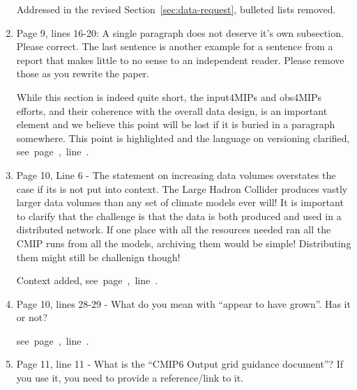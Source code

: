 \documentclass[gmd,manuscript]{copernicus}
\newcommand{\plref}[1]{\mbox{see page \pageref{p-#1}, line
    \lineref{l-#1}.}}
\newenvironment{answer}{\color{blue}}{}
\begin{document}
\begin{enumerate}[label=RC3-\arabic*,leftmargin=*]
  \begin{answer}
    Addressed in the revised Section~\ref{sec:data-request}, bulleted
    lists removed.
  \end{answer}
\item Page 9, lines 16-20: A single paragraph does not deserve it’s own
  subsection. Please correct. The last sentence is another example for
  a sentence from a report that makes little to no sense to an
  independent reader. Please remove those as you rewrite the paper.

  \begin{answer}
    While this section is indeed quite short, the input4MIPs and
    obs4MIPs efforts, and their coherence with the overall data
    design, is an important element and we believe this point will be
    lost if it is buried in a paragraph somewhere. This point is
    highlighted and the language on versioning clarified,
    \plref{RC3-9}
  \end{answer}
\item Page 10, Line 6 - The statement on increasing data volumes
  overstates the case if its is not put into context. The Large Hadron
  Collider produces vastly larger data volumes than any set of climate
  models ever will! It is important to clarify that the challenge is
  that the data is both produced and used in a distributed network. If
  one place with all the resources needed ran all the CMIP runs from
  all the models, archiving them would be simple! Distributing them
  might still be challenign though!

  \begin{answer}
    Context added, \plref{RC3-10}
  \end{answer}
\item Page 10, lines 28-29 - What do you mean with “appear to have
  grown”. Has it or not?

  \begin{answer}
    \plref{RC3-11}
  \end{answer}
\item Page 11, line 11 - What is the “CMIP6 Output grid guidance
  document”? If you use it, you need to provide a reference/link to
  it.


\end{enumerate}
\end{document}

